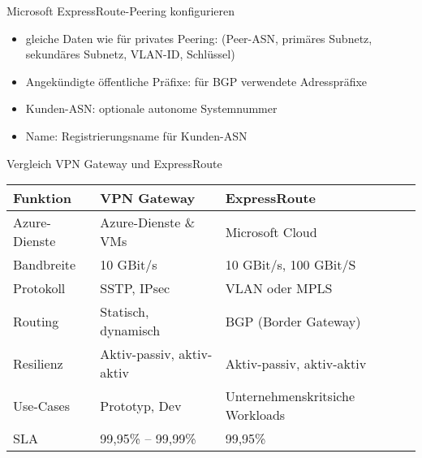 \begin{flashcard}[Definition]{Microsoft ExpressRoute-Peering konfigurieren}
    \begin{itemize}
        \item gleiche Daten wie für privates Peering: \newline
            (Peer-ASN, primäres Subnetz, sekundäres Subnetz, VLAN-ID, Schlüssel)
        \item Angekündigte öffentliche Präfixe: für BGP verwendete Adresspräfixe
        \item Kunden-ASN: optionale autonome Systemnummer
        \item Name: Registrierungsname für Kunden-ASN
    \end{itemize}
\end{flashcard}

\begin{flashcard}[Definition]{Vergleich VPN Gateway und ExpressRoute}
    \begin{tabular}{l|lll}
        Funktion       &  VPN Gateway               & ExpressRoute                    \\
        \hline
        Azure-Dienste  &  Azure-Dienste \& VMs      & Microsoft Cloud                 \\
        Bandbreite     &  10 GBit/s                 & 10 GBit/s, 100 GBit/S           \\
        Protokoll      &  SSTP, IPsec               & VLAN oder MPLS                  \\
        Routing        &  Statisch, dynamisch       & BGP (Border Gateway)            \\
        Resilienz      &  Aktiv-passiv, aktiv-aktiv & Aktiv-passiv, aktiv-aktiv       \\
        Use-Cases      & Prototyp, Dev              & Unternehmenskritsiche Workloads \\
        SLA            & 99,95\% -- 99,99\%         & 99,95\%                         \\
    \end{tabular}
\end{flashcard}


